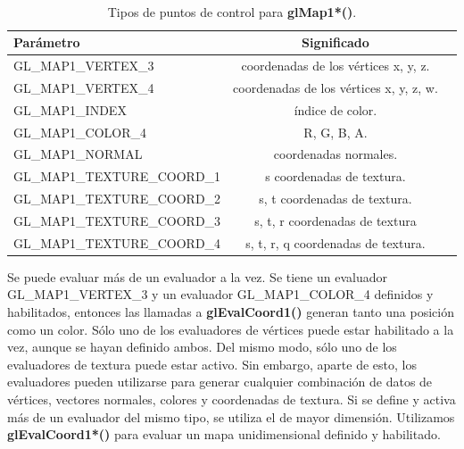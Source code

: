 \begin{table}[h]
\begin{center}
\caption{Tipos de puntos de control para \textbf{glMap1*()}.}\\
	{\color{grayblack}
\begin{tabular}{ p{6.5cm} cc }
\toprule
\textbf{Parámetro } & \textbf{Significado} \\ 
\midrule
GL\_MAP1\_VERTEX\_3 & coordenadas de los vértices x, y, z.\\

GL\_MAP1\_VERTEX\_4 & coordenadas de los vértices x, y, z, w. \\ 
GL\_MAP1\_INDEX & índice de color. \\ 

GL\_MAP1\_COLOR\_4 & R, G, B, A. \\ 

GL\_MAP1\_NORMAL & coordenadas normales. \\ 

GL\_MAP1\_TEXTURE\_COORD\_1 & s coordenadas de textura. \\ 

GL\_MAP1\_TEXTURE\_COORD\_2 & s, t coordenadas de textura. \\ 

GL\_MAP1\_TEXTURE\_COORD\_3  & s, t, r coordenadas de textura \\ 

GL\_MAP1\_TEXTURE\_COORD\_4  & s, t, r, q coordenadas de textura. \\ 
\bottomrule
\end{tabular}}
\label{tab:coeficientes}
\end{center}
\end{table}

Se puede evaluar más de un evaluador a la vez. Se tiene un evaluador GL\_MAP1\_VERTEX\_3 y un evaluador GL\_MAP1\_COLOR\_4 definidos y habilitados, entonces las llamadas a \textbf{glEvalCoord1()} generan tanto una posición como un color. Sólo uno de los evaluadores de vértices puede estar habilitado a la vez, aunque se hayan definido ambos. Del mismo modo, sólo uno de los evaluadores de textura puede estar activo. Sin embargo, aparte de esto, los evaluadores pueden utilizarse para generar cualquier combinación de datos de vértices, vectores normales, colores y coordenadas de textura. Si se define y activa más de un evaluador del mismo tipo, se utiliza el de mayor dimensión. Utilizamos \textbf{glEvalCoord1*()} para evaluar un mapa unidimensional definido y habilitado.

